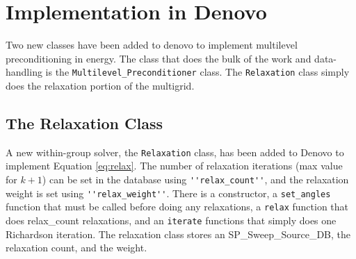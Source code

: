 \documentclass[12pt, letterpaper]{article}
\newcommand{\ve}[1]{\ensuremath{\mathbf{#1}}}
\begin{document}
%

\section{Implementation in Denovo}
Two new classes have been added to denovo to implement multilevel preconditioning in energy. The class that does the bulk of the work and data-handling is the \verb+Multilevel_Preconditioner+ class. The \verb+Relaxation+ class simply does the relaxation portion of the multigrid. 

\subsection{The Relaxation Class}
A new within-group solver, the \verb+Relaxation+ class, has been added to Denovo to implement Equation \eqref{eq:relax}. The number of relaxation iterations (max value for $k+1$) can be set in the database using \verb+''relax_count''+, and the relaxation weight is set using \verb+''relax_weight''+. There is a constructor, a \verb+set_angles+ function that must be called before doing any relaxations, a \verb+relax+ function that does relax\_count relaxations, and an \verb+iterate+ functions that simply does one Richardson iteration. The relaxation class stores an SP\_Sweep\_Source\_DB, the relaxation count, and the weight. 
\end{document}
